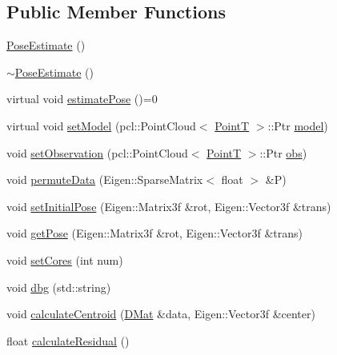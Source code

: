 \subsection*{\-Public \-Member \-Functions}
\begin{DoxyCompactItemize}
\item 
\hyperlink{classPoseEstimate_ac3e3718fe27dccb3be0760d6bcdc18c6}{\-Pose\-Estimate} ()
\item 
\hyperlink{classPoseEstimate_ac024bd041a98d233647f106e6878d986}{$\sim$\-Pose\-Estimate} ()
\item 
virtual void \hyperlink{classPoseEstimate_a6fdf8eec3cadac69bcf8181c89d82903}{estimate\-Pose} ()=0
\item 
virtual void \hyperlink{classPoseEstimate_a4c420a20ba20719f7c19b8bbec79b6d9}{set\-Model} (pcl\-::\-Point\-Cloud$<$ \hyperlink{common_8h_abd10555a534258e2739a38c928ef5db1}{\-Point\-T} $>$\-::\-Ptr \hyperlink{classPoseEstimate_aca9217cfe0d272f172f65adfc31764f1}{model})
\item 
void \hyperlink{classPoseEstimate_ae884275e741789db776be52f373f387f}{set\-Observation} (pcl\-::\-Point\-Cloud$<$ \hyperlink{common_8h_abd10555a534258e2739a38c928ef5db1}{\-Point\-T} $>$\-::\-Ptr \hyperlink{classPoseEstimate_a75beb14fe9fd10fc8a80eff84f348c1c}{obs})
\item 
void \hyperlink{classPoseEstimate_a9daadf84954e07d295c2286172f01904}{permute\-Data} (\-Eigen\-::\-Sparse\-Matrix$<$ float $>$ \&\-P)
\item 
void \hyperlink{classPoseEstimate_af36ed6ccd1839eedff0f51f0bdaa23c7}{set\-Initial\-Pose} (\-Eigen\-::\-Matrix3f \&rot, \-Eigen\-::\-Vector3f \&trans)
\item 
void \hyperlink{classPoseEstimate_aa52680b9860a5a33201dfdd888e34c5a}{get\-Pose} (\-Eigen\-::\-Matrix3f \&rot, \-Eigen\-::\-Vector3f \&trans)
\item 
void \hyperlink{classPoseEstimate_a82d9fbf262d32338a9275f9cedee3f6c}{set\-Cores} (int num)
\item 
void \hyperlink{classPoseEstimate_a97197a2b7b19b8a975984841feaab1dc}{dbg} (std\-::string)
\item 
void \hyperlink{classPoseEstimate_a32bcf3736214b6635f9da6ad6be5f0ce}{calculate\-Centroid} (\hyperlink{common_8h_a4ec92c19d079ab17709ca464cfb8e5bd}{\-D\-Mat} \&data, \-Eigen\-::\-Vector3f \&center)
\item 
float \hyperlink{classPoseEstimate_ae195b53478db98ca075a6f0359ea422c}{calculate\-Residual} ()
\end{DoxyCompactItemize}
